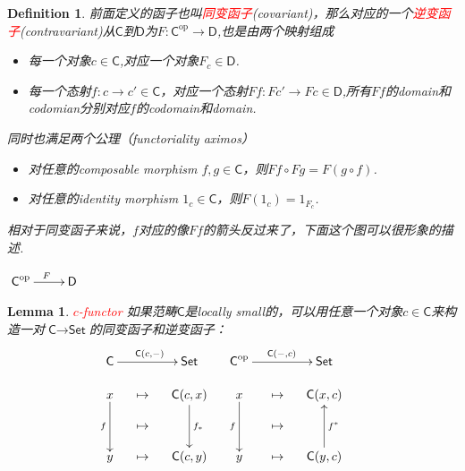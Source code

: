 \documentclass{article}
\newtheorem{lemma}[theorem]{Lemma}
\newtheorem{definition}[theorem]{Definition}
\newcommand*{\cat}[1]{\textsf{#1}\xspace}
\newcommand{\Set}{\textsf{Set}\xspace}
\newcommand{\op}{\textrm{op}}
\newcommand{\redt}[1]{\textcolor{red}{#1}}
\begin{document}
\begin{definition}
\rm 前面定义的函子也叫\redt{同变函子}(covariant)，那么对应的一个\redt{逆变函子}(contravariant)从$\cat{C}$到$\cat{D}$为$F: \cat{C}^{\op} \rightarrow \cat{D} $,也是由两个映射组成
\begin{itemize}
	\item 每一个对象$c \in \cat{C}$,对应一个对象$F_c \in \cat{D}$.
	\item 每一个态射$f \colon c \rightarrow	c' \in \cat{C}$，对应一个态射$Ff \colon Fc' \rightarrow Fc \in \cat{D}$,所有$Ff$的domain和codomian分别对应$f$的codomain和domain.
\end{itemize}
同时也满足两个公理（functoriality aximos）
\begin{itemize}
	\item 对任意的composable morphism $f,g \in \cat{C}$，则$Ff \circ Fg = F(g \circ f)$.
	\item 对任意的identity morphism $1_c \in \cat{C}$，则$F(1_c)=1_{F_c}$.
\end{itemize}
相对于同变函子来说，$f$对应的像$Ff$的箭头反过来了，下面这个图可以很形象的描述.
\begin{center}
$\xymatrix{\cat{C}^{\op}\ar[r]^F&\cat{D}}$ \\
\end{center} 
\end{definition}	

\begin{lemma}
\rm \redt{$c$-functor}  如果范畴$\cat{C}$是locally small的，可以用任意一个对象$c \in \cat{C}$来构造一对$\cat{C} \to \Set$的同变函子和逆变函子：
\[
	\xymatrix@-1pc{
	\cat{C}\ar[rr]^{\cat{C}(c,-)} & & \Set & \cat{C}^\op \ar^{\cat{C}(-,c)}[rr] & & \Set \\
	x\ar[dd]_{f} & \mapsto & \cat{C}(c,x)\ar[dd]^{f_*} & x\ar[dd]_{f} & \mapsto & \cat{C}(x,c) \\
	  &\mapsto & & & \mapsto & &\\
	y & \mapsto & \cat{C}(c,y) & y & \mapsto & \cat{C}(y,c)\ar[uu]_{f^*} \\
	}
	\]
\end{lemma}
\end{document}
